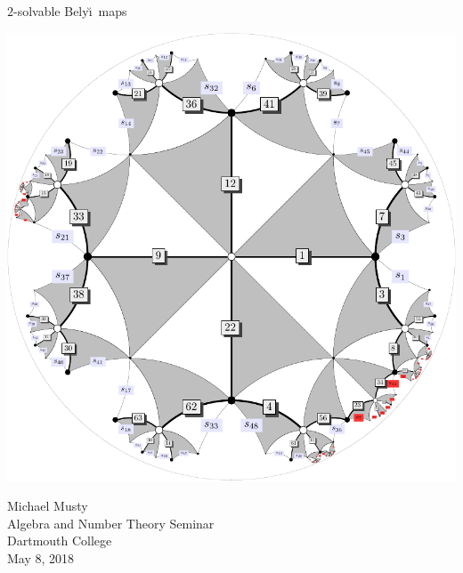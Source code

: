 \documentclass[xcolor=dvipsnames]{beamer}
\theoremstyle{plain}
\newcommand{\Belyi}{Bely\u{\i}}
\begin{document}
  \begin{frame}[plain]
    \begin{center}{
      \Huge\color{SeaGreen}
      $2$-solvable
      \Belyi\ maps
    }
    \end{center}
    \begin{center}
      \includegraphics[scale = 0.3]{64S23-g9.pdf}
    \end{center}
    \begin{center}
      Michael Musty\\
      Algebra and Number Theory Seminar\\
      Dartmouth College\\
      May 8, 2018
    \end{center}
  \end{frame}
\end{document}
